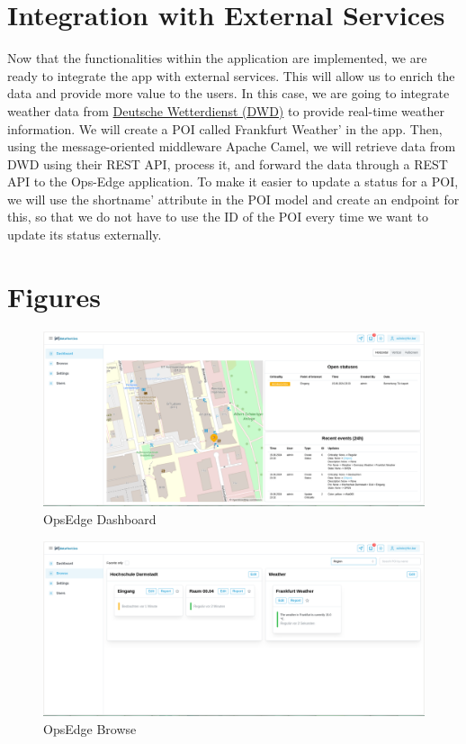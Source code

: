 \section{Integration with External Services}
\label{sec:internship_experience:integration_external_services}

Now that the functionalities within the application are implemented, we are ready to integrate the app with external services. This will allow us to enrich the data and provide more value to the users. In this case, we are going to integrate weather data from \href{https://www.dwd.de/DE/Home/home_node.html}{Deutsche Wetterdienst (DWD)} to provide real-time weather information. We will create a POI called Frankfurt Weather' in the app. Then, using the message-oriented middleware Apache Camel, we will retrieve data from DWD using their REST API, process it, and forward the data through a REST API to the Ops-Edge application. To make it easier to update a status for a POI, we will use the shortname' attribute in the POI model and create an endpoint for this, so that we do not have to use the ID of the POI every time we want to update its status externally.

\section{Figures}
\label{sec:internship_experience:figures}

\begin{figure}[h]
    \centering
    \includegraphics[width=1\textwidth]{gfx/opsedge-dashboard.png}
    \caption{OpsEdge Dashboard}
    \label{fig:opsedge_dashboard}
\end{figure}

\begin{figure}[h]
    \centering
    \includegraphics[width=1\textwidth]{gfx/opsedge-browse-group-by-region.png}
    \caption{OpsEdge Browse}
    \label{fig:opsedge_browse}
\end{figure}

